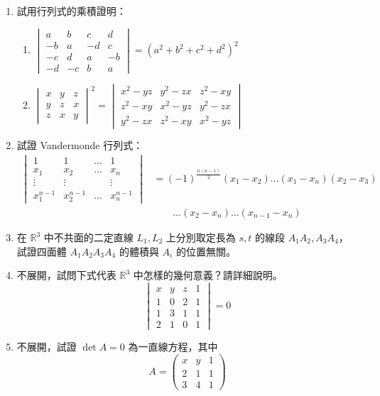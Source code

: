 \begin{enumerate}[label=\arabic*., leftmargin=2em]
  \item 試用行列式的乘積證明：
  \begin{enumerate}[label=(\roman*)]
    \item $\begin{vmatrix}
    a & b & c & d \\
    -b & a & -d & c \\
    -c & d & a & -b \\
    -d & -c & b & a
    \end{vmatrix} = (a^2+b^2+c^2+d^2)^2$
    \item $\begin{vmatrix}
    x & y & z \\
    y & z & x \\
    z & x & y
    \end{vmatrix}^2 = \begin{vmatrix}
    x^2-yz & y^2-zx & z^2-xy \\
    z^2-xy & x^2-yz & y^2-zx \\
    y^2-zx & z^2-xy & x^2-yz
    \end{vmatrix}$
  \end{enumerate}

  \item 試證 Vandermonde 行列式：
  \begin{align*}
  \begin{vmatrix}
  1 & 1 & \dots & 1 \\
  x_1 & x_2 & \dots & x_n \\
  \vdots & \vdots & & \vdots \\
  x_1^{n-1} & x_2^{n-1} & \dots & x_n^{n-1}
  \end{vmatrix}
  &= (-1)^{\frac{n(n-1)}{2}} (x_1-x_2)\dots(x_1-x_n)(x_2-x_3) \\
  &\qquad \dots(x_2-x_n)\dots(x_{n-1}-x_n)
  \end{align*}

  \item[\textbf{*10.}] 在 $\mathbb{R}^3$ 中不共面的二定直線 $L_1, L_2$ 上分別取定長為 $s, t$ 的線段 $A_1A_2, A_3A_4$，試證四面體 $A_1A_2A_3A_4$ 的體積與 $A_i$ 的位置無關。

  \item 不展開，試問下式代表 $\mathbb{R}^3$ 中怎樣的幾何意義？請詳細說明。
  \[ \begin{vmatrix}
  x & y & z & 1 \\
  1 & 0 & 2 & 1 \\
  1 & 3 & 1 & 1 \\
  2 & 1 & 0 & 1
  \end{vmatrix} = 0 \]

  \item 不展開，試證 $\det A = 0$ 為一直線方程，其中
  \[ A = \begin{pmatrix}
  x & y & 1 \\
  2 & 1 & 1 \\
  3 & 4 & 1
  \end{pmatrix} \]
\end{enumerate}

